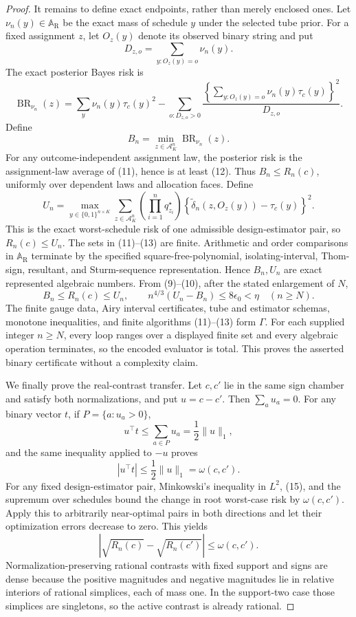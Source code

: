 \documentclass{article}
\begin{document}
\begin{proof}
It remains to define exact endpoints, rather than merely enclosed ones.  Let \(\nu_n(y)\in\mathbb A_{\mathrm R}\) be the exact mass of schedule \(y\) under the selected tube prior.  For a fixed assignment \(z\), let \(O_z(y)\) denote its observed binary string and put
\[
D_{z,o}=\sum_{y:O_z(y)=o}\nu_n(y).
\]
The exact posterior Bayes risk is
\[
\operatorname{BR}_{\nu_n}(z)
=\sum_y\nu_n(y)\tau_c(y)^2
-\sum_{o:D_{z,o}>0}
\frac{\left\{\sum_{y:O_z(y)=o}\nu_n(y)\tau_c(y)\right\}^2}{D_{z,o}}.
\tag{11}
\]
Define
\[
B_n=\min_{z\in\mathcal A_K^n}\operatorname{BR}_{\nu_n}(z).
\tag{12}
\]
For any outcome-independent assignment law, the posterior risk is the assignment-law average of (11), hence is at least (12).  Thus \(B_n\le R_n(c)\), uniformly over dependent laws and allocation faces.  Define
\[
U_n=\max_{y\in\{0,1\}^{n\times K}}
\sum_{z\in\mathcal A_K^n}
\left(\prod_{i=1}^nq_{z_i}^\star\right)
\left\{\widetilde\delta_n(z,O_z(y))-\tau_c(y)\right\}^2.
\tag{13}
\]
This is the exact worst-schedule risk of one admissible design-estimator pair, so \(R_n(c)\le U_n\).  The sets in (11)--(13) are finite.  Arithmetic and order comparisons in \(\mathbb A_{\mathrm R}\) terminate by the specified square-free-polynomial, isolating-interval, Thom-sign, resultant, and Sturm-sequence representation.  Hence \(B_n,U_n\) are exact represented algebraic numbers.  From (9)--(10), after the stated enlargement of \(N\),
\[
B_n\le R_n(c)\le U_n,
\qquad
n^{4/3}(U_n-B_n)\le8\epsilon_0<\eta
\quad(n\ge N).
\tag{14}
\]
The finite gauge data, Airy interval certificates, tube and estimator schemas, monotone inequalities, and finite algorithms (11)--(13) form \(\Gamma\).  For each supplied integer \(n\ge N\), every loop ranges over a displayed finite set and every algebraic operation terminates, so the encoded evaluator is total.  This proves the asserted binary certificate without a complexity claim.

We finally prove the real-contrast transfer.  Let \(c,c'\) lie in the same sign chamber and satisfy both normalizations, and put \(u=c-c'\).  Then \(\sum_a u_a=0\).  For any binary vector \(t\), if \(P=\{a:u_a>0\}\),
\[
u^\top t\le\sum_{a\in P}u_a=\frac12\lVert u\rVert_1,
\]
and the same inequality applied to \(-u\) proves
\[
|u^\top t|\le\frac12\lVert u\rVert_1=\omega(c,c').
\tag{15}
\]
For any fixed design-estimator pair, Minkowski's inequality in \(L^2\), (15), and the supremum over schedules bound the change in root worst-case risk by \(\omega(c,c')\).  Apply this to arbitrarily near-optimal pairs in both directions and let their optimization errors decrease to zero.  This yields
\[
\left|\sqrt{R_n(c)}-\sqrt{R_n(c')}\right|
\le\omega(c,c').
\tag{16}
\]
Normalization-preserving rational contrasts with fixed support and signs are dense because the positive magnitudes and negative magnitudes lie in relative interiors of rational simplices, each of mass one.  In the support-two case those simplices are singletons, so the active contrast is already rational.


\end{proof}
\end{document}
